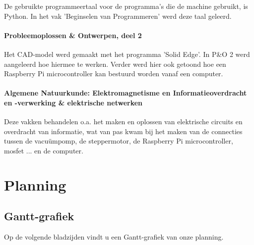 \documentclass[a4paper,twoside,kulak]{kulakreport} %
\begin{document}
De gebruikte programmeertaal voor de programma's die de machine gebruikt, is Python. In het vak 'Beginselen van Programmeren' werd deze taal geleerd. 

\paragraph{Probleemoplossen \& Ontwerpen, deel 2}

Het CAD-model werd gemaakt met het programma 'Solid Edge'. In P\&O 2 werd aangeleerd hoe hiermee te werken. Verder werd hier ook getoond hoe een Raspberry Pi microcontroller kan bestuurd worden vanaf een computer. 

\paragraph{Algemene Natuurkunde: Elektromagnetisme en Informatieoverdracht en -verwerking \& elektrische netwerken}

Deze vakken behandelen o.a. het maken en oplossen van elektrische circuits en overdracht van informatie, wat van pas kwam bij het maken van de connecties tussen de vacuümpomp, de steppermotor, de Raspberry Pi microcontroller, mosfet ... en de computer.

\clearpage

\section*{Planning}
\subsection*{Gantt-grafiek}
Op de volgende bladzijden vindt u een Gantt-grafiek van onze planning.



\end{document}
